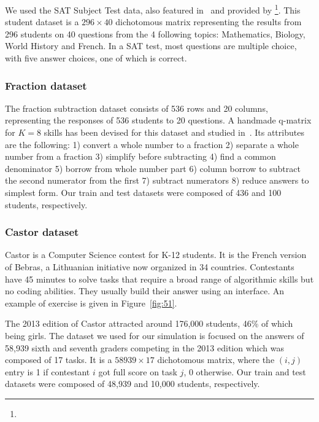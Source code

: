 \documentclass{edm_template}
\begin{document}
We used the SAT Subject Test data, also featured in~\cite{Winters2005, Desmarais2011} and provided by \phantom{Titus}\footnote{}. This student dataset is a $296 \times 40$ dichotomous matrix representing the results from 296 students on 40 questions from the 4 following topics: Mathematics, Biology, World History and French. In a SAT test, most questions are multiple choice, with five answer choices, one of which is correct.

\subsubsection{Fraction dataset}

The fraction subtraction dataset consists of 536 rows and 20 columns, representing the responses of 536 students to 20 questions. A handmade q-matrix for $K = 8$ skills has been devised for this dataset and studied in~\cite{DeLaTorreDouglas2004,DeCarlo2010}. Its attributes are the following:
1) convert a whole number to a fraction
2) separate a whole number from a fraction
3) simplify before subtracting
4) find a common denominator
5) borrow from whole number part
6) column borrow to subtract the second numerator from the first
7) subtract numerators
8) reduce answers to simplest form. Our train and test datasets were composed of 436 and 100 students, respectively.

\subsubsection{Castor dataset}

Castor is a Computer Science contest for K-12 students. It is the French version of Bebras, a Lithuanian initiative now organized in 34 countries. Contestants have 45 minutes to solve tasks that require a broad range of algorithmic skills but no coding abilities. They usually build their answer using an interface. An example of exercise is given in Figure~\ref{fig:51}.

The 2013 edition of Castor attracted around 176,000 students, 46\% of which being girls. The dataset we used for our simulation is focused on the answers of 58,939 sixth and seventh graders competing in the 2013 edition which was composed of 17 tasks. It is a $58939 \times 17$ dichotomous matrix, where the $(i, j)$ entry is 1 if contestant $i$ got full score on task $j$, 0 otherwise. Our train and test datasets were composed of 48,939 and 10,000 students, respectively.
\end{document}
